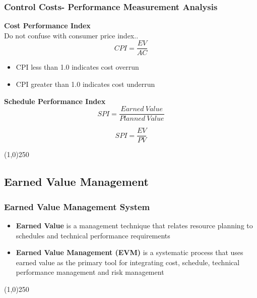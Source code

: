 \begin{frame}
\frametitle{Control Costs- Performance Measurement Analysis}

\textbf{Cost Performance Index}\\
Do not confuse with consumer price index..
\[
	CPI = \frac{EV}{AC}
\]
\begin{itemize}
	\item	CPI less than 1.0 indicates cost overrun
	\item	CPI greater than 1.0 indicates cost underrun
\end{itemize}


\textbf{Schedule Performance Index}\\
\[
	SPI = \frac{Earned\: Value}{Planned\: Value} 
\]

\[
	SPI = \frac{EV}{PV}
\]
\end{frame}
\begin{center}\line(1,0){250}\end{center}











\subsection{Earned Value Management}





\begin{frame}
\frametitle{Earned Value Management System}
\begin{itemize}
	\item \textbf{Earned Value} is a management technique that relates resource planning to schedules and technical performance requirements
	\item \textbf{Earned Value Management (EVM)} is a systematic process that uses earned value as the primary tool for integrating cost, schedule, technical performance management and risk management
\end{itemize}
\end{frame}
\begin{center}\line(1,0){250}\end{center}






